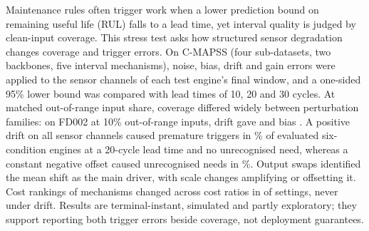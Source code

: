 Maintenance rules often trigger work when a lower prediction bound on remaining useful life (RUL) falls to a lead time, yet interval quality is judged by clean-input coverage. This stress test asks how structured sensor degradation changes coverage and trigger errors. On C-MAPSS (four sub-datasets, two backbones, five interval mechanisms), noise, bias, drift and gain errors were applied to the sensor channels of each test engine's final window, and a one-sided 95\% lower bound was compared with lead times of 10, 20 and 30 cycles. At matched out-of-range input share, coverage differed widely between perturbation families: on FD002 at 10\% out-of-range inputs, drift gave \JMatchDrift{} and bias \JMatchBias. A positive drift on all sensor channels caused premature triggers in \JDriftPremRange\% of evaluated six-condition engines at a 20-cycle lead time and no unrecognised need, whereas a constant negative offset caused unrecognised needs in \JCohNegUnrecSix\%. Output swaps identified the mean shift as the main driver, with scale changes amplifying or offsetting it. Cost rankings of mechanisms changed across cost ratios in \JRevTotal{} of \JRevGroups{} settings, never under drift. Results are terminal-instant, simulated and partly exploratory; they support reporting both trigger errors beside coverage, not deployment guarantees.
